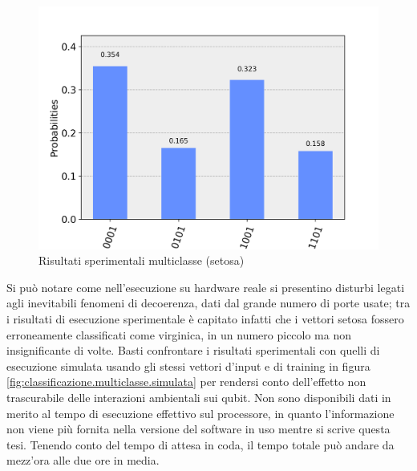 
\begin{figure}[h!]
    \centering
    \includegraphics[width=\linewidth]{gfx/setosa_reale_20190913:1716}
    \caption{Risultati sperimentali multiclasse (setosa)}
    \label{fig:classificazione.reale}
\end{figure}

Si può notare come nell'esecuzione su hardware reale si presentino disturbi legati 
agli inevitabili fenomeni di decoerenza, dati dal grande numero di porte usate; 
tra i risultati di esecuzione sperimentale è capitato infatti che i vettori setosa 
fossero erroneamente classificati come virginica, in un numero piccolo ma non 
insignificante di volte. 
Basti confrontare i risultati sperimentali con quelli di esecuzione simulata usando gli 
stessi vettori d'input e di training in figura \ref{fig:classificazione.multiclasse.simulata} per rendersi 
conto dell'effetto non trascurabile delle interazioni ambientali sui qubit.
Non sono disponibili dati in merito al tempo di esecuzione effettivo sul processore, 
in quanto l'informazione non viene più fornita nella versione del software in uso 
mentre si scrive questa tesi. Tenendo conto del tempo di attesa in coda, il tempo totale 
può andare da mezz'ora alle due ore in media. 

